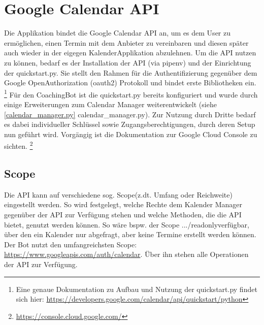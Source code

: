     \section{Google Calendar API}
        Die Applikation bindet die Google Calendar API \cite{googleCalAPI} an, um es dem User zu ermöglichen, einen Termin mit dem Anbieter zu vereinbaren und diesen später auch wieder in der eigegen Kalender\-Applikation abzulehnen.
        Um die API nutzen zu können, bedarf es der Installation der API (via pipenv) und der Einrichtung der quickstart.py. Sie stellt den Rahmen für die Authentifizierung gegenüber dem Google Open\-Authorization (oauth2) Protokoll und bindet erste Bibliotheken ein.
        \footnote{Eine genaue Dokumentation zu Aufbau und Nutzung der quickstart.py findet sich hier: \url{https://developers.google.com/calendar/api/quickstart/python}}
        Für den CoachingBot ist die quickstart.py bereits konfiguriert und wurde durch einige Erweiterungen zum Calendar Manager weiterentwickelt (siehe \ref{calendar_manager.py} calendar\_manager.py). Zur Nutzung durch Dritte bedarf es dabei individueller Schlüssel sowie Zugangsberechtigungen, durch deren Setup nun geführt wird. Vorgängig ist die Dokumentation zur Google Cloud Console zu sichten. 
        \footnote{\url{https://console.cloud.google.com/}}
        
            \subsection{Scope}
                Die API kann auf verschiedene sog. \glq Scope\grq (z.dt. Umfang oder Reichweite) eingestellt werden. So wird festgelegt, welche Rechte dem Kalender Manager gegenüber der API zur Verfügung stehen und welche Methoden, die die API bietet, genutzt werden können. So wäre bspw. der Scope \glqq.../readonly\grqq verfügbar, über den ein Kalender nur abgefragt, aber keine Termine erstellt werden können.\\
                Der Bot nutzt den umfangreichsten Scope: \glqq\url{https://www.googleapis.com/auth/calendar}\grqq. Über ihn stehen alle Operationen der API zur Verfügung.

